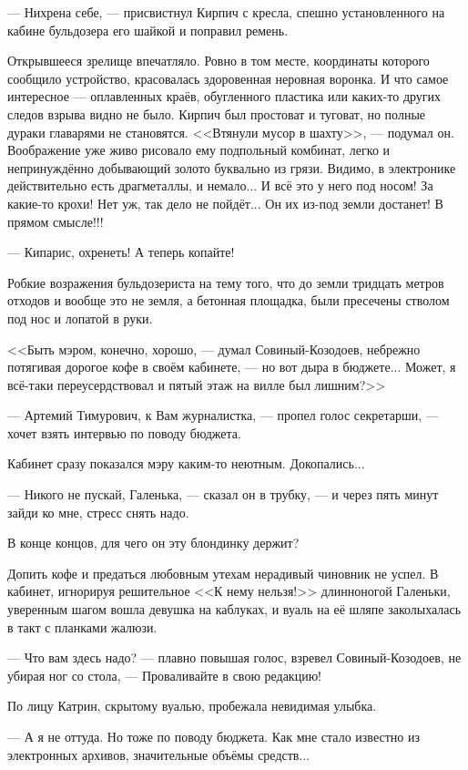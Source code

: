 \emptypar


--- Нихрена себе, --- присвистнул Кирпич с кресла, спешно установленного на кабине бульдозера его шайкой и поправил ремень.

Открывшееся зрелище впечатляло.
Ровно в том месте, координаты которого сообщило устройство, красовалась здоровенная неровная воронка.
И что самое интересное --- оплавленных краёв, обугленного пластика или каких-то других следов взрыва видно не было.
Кирпич был простоват и туговат, но полные дураки главарями не становятся.
<<Втянули мусор в шахту>>, --- подумал он. Воображение уже живо рисовало ему подпольный комбинат,
легко и непринуждённо добывающий золото буквально из грязи. Видимо, в электронике действительно есть драгметаллы, и немало...
И всё это у него под носом! За какие-то крохи! Нет уж, так дело не пойдёт... Он их из-под земли достанет! В прямом смысле!!!

--- Кипарис, охренеть! А теперь копайте!

Робкие возражения бульдозериста на тему того, что до земли тридцать метров отходов и вообще это не земля,
а бетонная площадка, были пресечены стволом под нос и лопатой в руки.

\emptypar

<<Быть мэром, конечно, хорошо, --- думал Совиный-Козодоев, небрежно потягивая дорогое кофе в своём кабинете,
--- но вот дыра в бюджете... Может, я всё-таки переусердствовал и пятый этаж на вилле был лишним?>>

--- Артемий Тимурович, к Вам журналистка, --- пропел голос секретарши, --- хочет взять интервью по поводу бюджета.

Кабинет сразу показался мэру каким-то неютным. Докопались...

--- Никого не пускай, Галенька, --- сказал он в трубку, --- и через пять минут зайди ко мне, стресс снять надо.

В конце концов, для чего он эту блондинку держит?

Допить кофе и предаться любовным утехам нерадивый чиновник не успел.
В кабинет, игнорируя решительное <<К нему нельзя!>> длинноногой Галеньки, уверенным шагом вошла девушка на каблуках,
и вуаль на её шляпе заколыхалась в такт с планками жалюзи.

--- Что вам здесь надо? --- плавно повышая голос, взревел Совиный-Козодоев, не убирая ног со стола,
--- Проваливайте в свою редакцию!

По лицу Катрин, скрытому вуалью, пробежала невидимая улыбка.

--- А я не оттуда. Но тоже по поводу бюджета. Как мне стало известно из электронных архивов, значительные объёмы средств...

